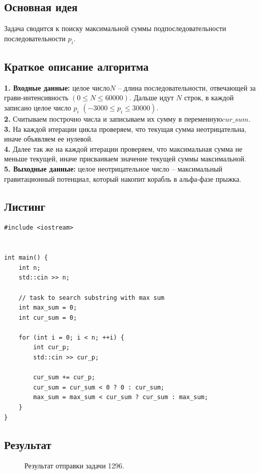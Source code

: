 \documentclass[a5paper, 10pt]{article}
\theoremstyle{definition}
\theoremstyle{plain}
\theoremstyle{remark}
\begin{document}
\subsection{Основная идея}
Задача сводится к поиску максимальной суммы подпоследовательности последовательности $p_i$.

\subsection{Краткое описание алгоритма}
\textbf{1. Входные данные:} целое число$N$ -- длина последовательности, отвечающей за грави-интенсивность $(0 \leq N \leq 60000)$. Дальше идут $N$ строк, в каждой записано целое число $p_i$ $ (-3000 \leq p_i \leq 30000)$.\\
\textbf{2.} Считываем построчно числа и записываем их сумму в переменную$cur\_sum$.\\
\textbf{3.} На каждой итерации цикла проверяем, что текущая сумма неотрицательна, иначе объявляем ее нулевой.\\
\textbf{4.} Далее так же на каждой итерации проверяем, что максимальная сумма не меньше текущей, иначе присваиваем значение текущей суммы максимальной.\\
\textbf{5. Выходные данные:} целое неотрицательное число -- максимальный гравитационный потенциал, который накопит корабль в альфа-фазе прыжка.


\subsection{Листинг}

\begin{center}
\begin{lstlisting}[label=some-code,caption={Исходный код для 1296}]
#include <iostream>


int main() {
    int n;
    std::cin >> n;

    // task to search substring with max sum
    int max_sum = 0;
    int cur_sum = 0;

    for (int i = 0; i < n; ++i) {
        int cur_p;
        std::cin >> cur_p;

        cur_sum += cur_p;
        cur_sum = cur_sum < 0 ? 0 : cur_sum;
        max_sum = max_sum < cur_sum ? cur_sum : max_sum;
    }
}

\end{lstlisting}
\end{center}

\subsection{Результат}
\begin{figure}[h]
\caption{Результат отправки задачи 1296.}
\end{figure}
\end{document}
